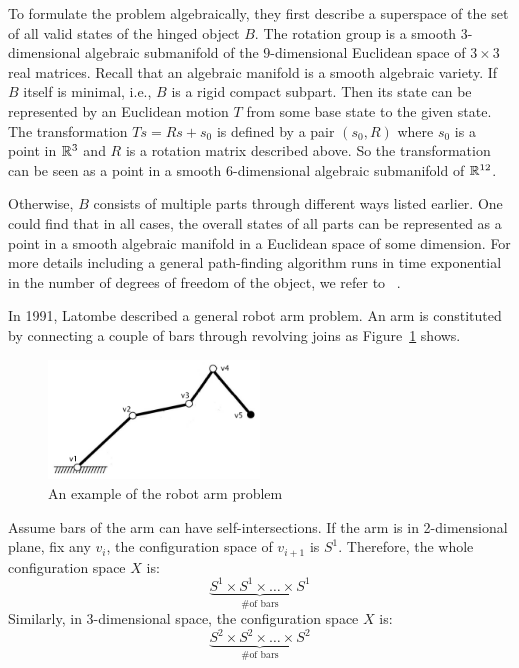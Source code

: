 To formulate the problem algebraically, they first describe a superspace of the set of all valid states of the hinged object \(B\).
The rotation group is a smooth \(3\)-dimensional algebraic submanifold of the \(9\)-dimensional Euclidean space of \(3\times 3\) real matrices.
Recall that an algebraic manifold is a smooth algebraic variety.
If \(B\) itself is minimal, i.e., \(B\) is a rigid compact subpart. Then its state can be represented by an Euclidean motion \(T\) from some base state to the given state.
The transformation \(Ts=Rs+s_0\) is defined by a pair \((s_0, R)\) where \(s_0\) is a point in \(\mathbb{R}^3\) and \(R\) is a rotation matrix described above.
So the transformation can be seen as a point in a smooth \(6\)-dimensional algebraic submanifold of \(\mathbb{R}^{12}\).

Otherwise, \(B\) consists of multiple parts through different ways listed earlier. One could find that in all cases, the overall states of all parts can be represented as a point in a smooth algebraic manifold in a Euclidean space of some dimension. For more details including a general path-finding algorithm runs in time exponential in the number of degrees of freedom of the object, we refer to ~\cite{schwartz1983piano}.

\begin{example}
  In 1991, Latombe described a general robot arm problem. An arm is constituted by connecting a couple of bars through revolving joins as Figure~\ref{fig:arm} shows.
  \begin{figure}
    \begin{center}
      \includegraphics[width=0.5\textwidth]{fig-arm}
    \end{center}
    \caption{An example of the robot arm problem}
    \label{fig:arm}
  \end{figure}
\end{example}
Assume bars of the arm can have self-intersections. If the arm is in 2-dimensional plane, fix any \(v_i\), the configuration space of \(v_{i+1}\) is \(S^1\). Therefore, the whole configuration space \(X\) is:
\[\underbrace{S^1\times S^1\times\dots\times S^1}_{\text{\# of bars}}\]
Similarly, in 3-dimensional space, the configuration space \(X\) is:
\[\underbrace{S^2\times S^2\times\dots\times S^2}_{\text{\# of bars}}\]


